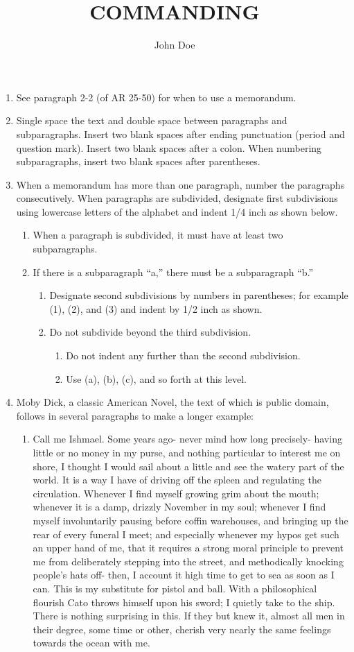 \documentclass{armymemo}
\author{John Doe}\rank{CPT}\branch{CY}\title{COMMANDING}
\begin{document}
\begin{enumerate}
\item See paragraph 2-2 (of AR 25-50) for when to use a memorandum.
\item Single space the text and double space between paragraphs and subparagraphs. Insert two blank spaces after ending punctuation (period and question mark). Insert two blank spaces after a colon. When numbering subparagraphs, insert two blank spaces after parentheses.
\item When a memorandum has more than one paragraph, number the paragraphs consecutively. When paragraphs are subdivided, designate first subdivisions using lowercase letters of the alphabet and indent 1/4 inch as shown below.
  \begin{enumerate}
  \item When a paragraph is subdivided, it must have at least two subparagraphs.
  \item If there is a subparagraph ``a,'' there must be a subparagraph ``b.''
    \begin{enumerate}
    \item Designate second subdivisions by numbers in parentheses; for example (1), (2), and (3) and indent by 1/2 inch as shown.
    \item Do not subdivide beyond the third subdivision.
      \begin{enumerate}
      \item Do not indent any further than the second subdivision.
      \item Use (a), (b), (c), and so forth at this level.
      \end{enumerate}
    \end{enumerate}
  \end{enumerate}
\item Moby Dick, a classic American Novel, the text of which is public domain,
  follows in several paragraphs to make a longer example:

  \begin{enumerate}
  \item Call me Ishmael. Some years ago- never mind how long precisely- having little or
    no money in my purse, and nothing particular to interest me on shore, I thought
    I would sail about a little and see the watery part of the world. It is a way I
    have of driving off the spleen and regulating the circulation. Whenever I find
    myself growing grim about the mouth; whenever it is a damp, drizzly November in
    my soul; whenever I find myself involuntarily pausing before coffin warehouses,
    and bringing up the rear of every funeral I meet; and especially whenever my
    hypos get such an upper hand of me, that it requires a strong moral principle to
    prevent me from deliberately stepping into the street, and methodically knocking
    people's hats off- then, I account it high time to get to sea as soon as I can.
    This is my substitute for pistol and ball. With a philosophical flourish Cato
    throws himself upon his sword; I quietly take to the ship. There is nothing
    surprising in this. If they but knew it, almost all men in their degree, some
    time or other, cherish very nearly the same feelings towards the ocean with me.


\end{enumerate}
\end{enumerate}
\end{document}
